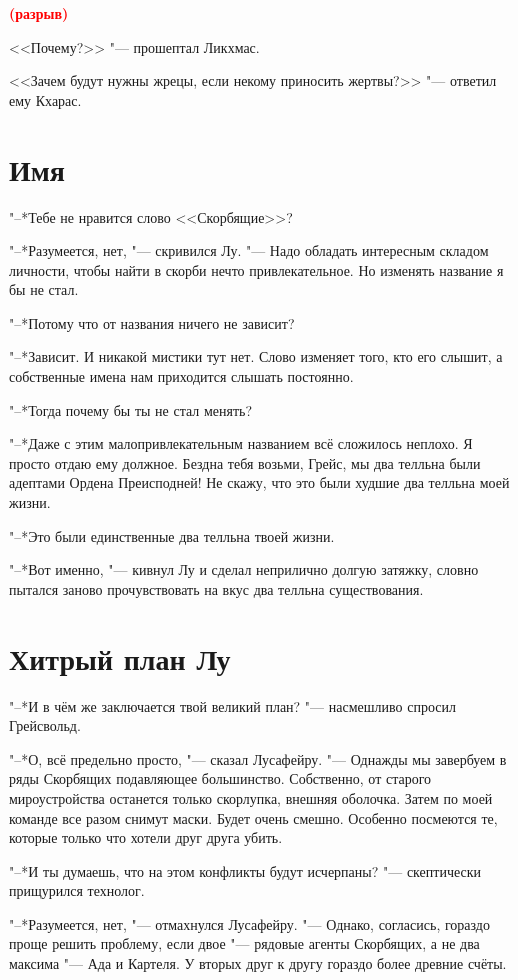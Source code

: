 \documentclass[a4paper,10pt,fleqn]{book}
\newcommand{\spacing}{\textcolor{red}{\textbf{(разрыв)}}}
\begin{document}
\spacing

<<Почему?>> "--- прошептал Ликхмас.

<<Зачем будут нужны жрецы, если некому приносить жертвы?>> "--- ответил ему Кхарас.

\section{Имя}

"--*Тебе не нравится слово <<Скорбящие>>?

"--*Разумеется, нет, "--- скривился Лу.
"--- Надо обладать интересным складом личности, чтобы найти в скорби нечто привлекательное.
Но изменять название я бы не стал.

"--*Потому что от названия ничего не зависит?

"--*Зависит.
И никакой мистики тут нет.
Слово изменяет того, кто его слышит, а собственные имена нам приходится слышать постоянно.

"--*Тогда почему бы ты не стал менять?

"--*Даже с этим малопривлекательным названием всё сложилось неплохо.
Я просто отдаю ему должное.
Бездна тебя возьми, Грейс, мы два телльна были адептами Ордена Преисподней!
Не скажу, что это были худшие два телльна моей жизни.

"--*Это были единственные два телльна твоей жизни.

"--*Вот именно, "--- кивнул Лу и сделал неприлично долгую затяжку, словно пытался заново прочувствовать на вкус два телльна существования.

\section{Хитрый план Лу}

"--*И в чём же заключается твой великий план? "--- насмешливо спросил Грейсвольд.

"--*О, всё предельно просто, "--- сказал Лусафейру.
"--- Однажды мы завербуем в ряды Скорбящих подавляющее большинство.
Собственно, от старого мироустройства останется только скорлупка, внешняя оболочка.
Затем по моей команде все разом снимут маски.
Будет очень смешно.
Особенно посмеются те, которые только что хотели друг друга убить.

"--*И ты думаешь, что на этом конфликты будут исчерпаны? "--- скептически прищурился технолог.

"--*Разумеется, нет, "--- отмахнулся Лусафейру.
"--- Однако, согласись, гораздо проще решить проблему, если двое "--- рядовые агенты Скорбящих, а не два максима "--- Ада и Картеля.
У вторых друг к другу гораздо более древние счёты.
\end{document}
